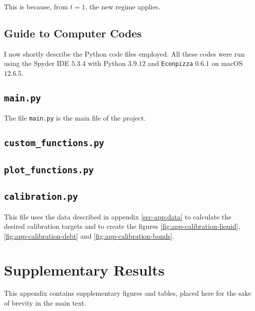 \documentclass[12pt]{article} %
\numberwithin{equation}{section} %
\numberwithin{figure}{section}
\numberwithin{table}{section}
\begin{document}
\begin{refsection}
\begin{appendices}
This is because, from $t=1$, the new regime applies.

\subsection{Guide to Computer Codes}
\label{sec-app:codes-guide}

I now shortly describe the Python code files employed. All these codes were run using the Spyder IDE $5.3.4$ with Python $3.9.12$ and \texttt{Econpizza} $0.6.1$ on macOS $12.6.5$.

\subsection*{\texttt{main.py}}

The file \texttt{main.py} is the main file of the project.

\subsection*{\texttt{custom\_functions.py}}

\subsection*{\texttt{plot\_functions.py}}

\subsection*{\texttt{calibration.py}}

This file uses the data described in appendix \ref{sec-app:data} to calculate the desired calibration targets and to create the figures \ref{fig:app-calibration-liquid}, \ref{fig:app-calibration-debt} and \ref{fig:app-calibration-bonds}.

\thispagestyle{plain}
\section{Supplementary Results}
\label{sec-app:figures}

This appendix contains supplementary figures and tables, placed here for the sake of brevity in the main text.


\end{appendices}
\end{refsection}
\end{document}
